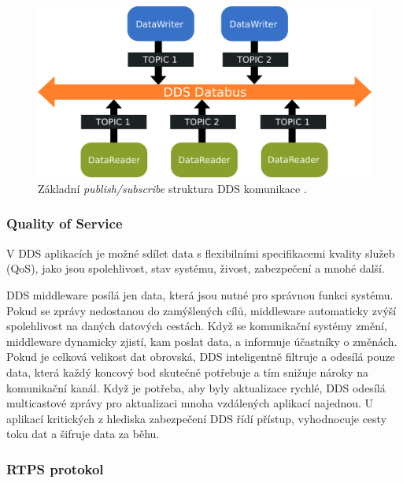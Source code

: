 \begin{figure}[!ht]
  \begin{center}
    \includegraphics[scale=0.35]{obrazky/DDS2}
  \end{center}
  \caption[Základní \textit{publish/subscribe} struktura \acs{DDS} komunikace]{Základní \textit{publish/subscribe} struktura \acs{DDS} komunikace \cite{DDS_PubSub}.}
  \label{fig:DDSarch}
\end{figure}

\subsubsection{Quality of Service}

V \acs{DDS} aplikacích je možné sdílet data s flexibilními specifikacemi kvality služeb (\acs{QoS}), jako jsou spolehlivost, stav systému, živost, zabezpečení a mnohé další. 

\acs{DDS} middleware posílá jen data, která jsou nutné pro správnou funkci systému. Pokud se zprávy nedostanou do zamýšlených cílů, middleware automaticky zvýší spolehlivost na daných datových cestách. Když se komunikační systémy změní, middleware dynamicky zjistí, kam poslat data, a informuje účastníky o změnách. Pokud je celková velikost dat obrovská, \acs{DDS} inteligentně filtruje a odesílá pouze data, která každý koncový bod skutečně potřebuje a tím snižuje nároky na komunikační kanál. Když je potřeba, aby byly aktualizace rychlé, \acs{DDS} odesílá multicastové zprávy pro aktualizaci mnoha vzdálených aplikací najednou. U aplikací kritických \break z hlediska zabezpečení \acs{DDS} řídí přístup, vyhodnocuje cesty toku dat a šifruje data za běhu. \cite{DDS_Main}

\subsubsection{\acs{RTPS} protokol}


